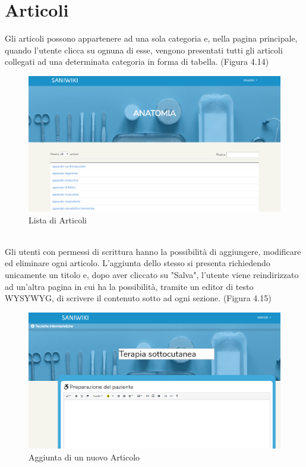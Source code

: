 \documentclass[twoside]{supsistudent}
\begin{document}
\section{Articoli}
Gli articoli possono appartenere ad una sola categoria e, nella pagina principale, quando l'utente clicca su ognuna di esse, vengono presentati tutti gli articoli collegati ad una determinata categoria in forma di tabella. (Figura 4.14)\\
\begin{figure}[!h]
\centering
\includegraphics[scale=0.4]{saniwiki_articoli.png}
\caption{Lista di Articoli}
\end{figure}
\\
Gli utenti con permessi di scrittura hanno la possibilità di aggiungere, modificare ed eliminare ogni articolo. L'aggiunta dello stesso si presenta richiedendo unicamente un titolo e, dopo aver cliccato su "Salva", l'utente viene reindirizzato ad un'altra pagina in cui ha la possibilità, tramite un editor di testo WYSYWYG, di scrivere il contenuto sotto ad ogni sezione. (Figura 4.15)\\
\begin{figure}[!h]
\centering
\includegraphics[scale=0.4]{saniwiki_singoloarticolo.png}
\caption{Aggiunta di un nuovo Articolo}
\end{figure}
\end{document}
